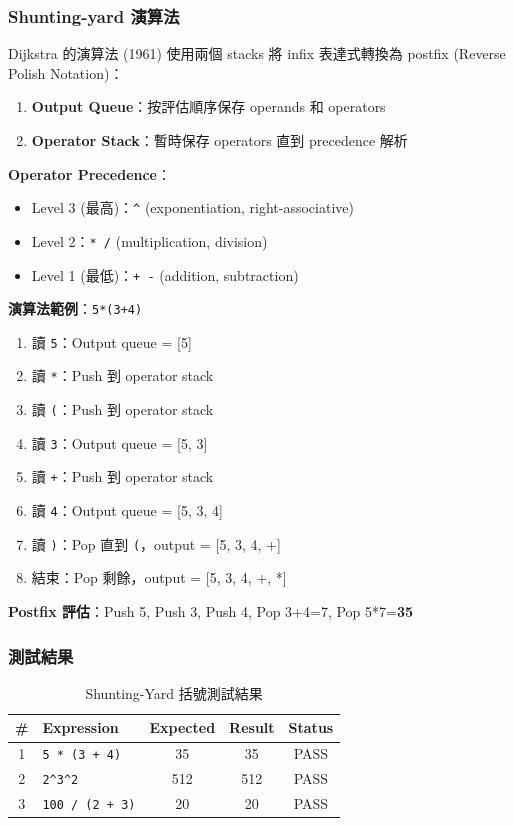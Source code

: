 \documentclass[journal]{IEEEtran}
\begin{document}
\subsubsection{Shunting-yard 演算法}
Dijkstra 的演算法 (1961) 使用兩個 stacks 將 infix 表達式轉換為 postfix (Reverse Polish Notation)：
\begin{enumerate}
    \item \textbf{Output Queue}：按評估順序保存 operands 和 operators
    \item \textbf{Operator Stack}：暫時保存 operators 直到 precedence 解析
\end{enumerate}

\textbf{Operator Precedence}：
\begin{itemize}
    \item Level 3 (最高)：\texttt{\^{}} (exponentiation, right-associative)
    \item Level 2：\texttt{* /} (multiplication, division)
    \item Level 1 (最低)：\texttt{+ -} (addition, subtraction)
\end{itemize}

\textbf{演算法範例}：\texttt{5*(3+4)}
\begin{enumerate}
    \item 讀 \texttt{5}：Output queue = [5]
    \item 讀 \texttt{*}：Push 到 operator stack
    \item 讀 \texttt{(}：Push 到 operator stack
    \item 讀 \texttt{3}：Output queue = [5, 3]
    \item 讀 \texttt{+}：Push 到 operator stack
    \item 讀 \texttt{4}：Output queue = [5, 3, 4]
    \item 讀 \texttt{)}：Pop 直到 \texttt{(}，output = [5, 3, 4, +]
    \item 結束：Pop 剩餘，output = [5, 3, 4, +, *]
\end{enumerate}

\textbf{Postfix 評估}：Push 5, Push 3, Push 4, Pop 3+4=7, Pop 5*7=\textbf{35}

\subsubsection{測試結果}
\begin{table}[htbp]
\centering
\caption{Shunting-Yard 括號測試結果}
\footnotesize
\begin{tabular}{@{}clccc@{}}
\toprule
\textbf{\#} & \textbf{Expression} & \textbf{Expected} & \textbf{Result} & \textbf{Status} \\
\midrule
1 & \texttt{5 * (3 + 4)} & 35 & 35 & PASS \\
2 & \texttt{2\textasciicircum 3\textasciicircum 2} & 512 & 512 & PASS \\
3 & \texttt{100 / (2 + 3)} & 20 & 20 & PASS \\
\bottomrule
\end{tabular}
\end{table}
\end{document}
